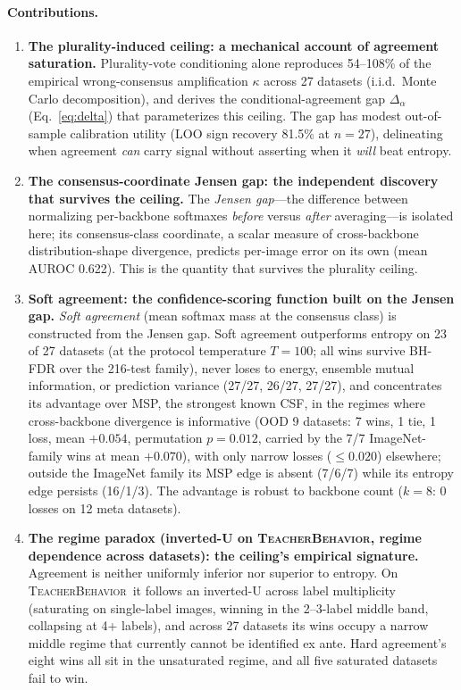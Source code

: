 \documentclass[a4paper,fleqn]{cas-sc}
\newcommand{\tb}{\textsc{TeacherBehavior}}
\begin{document}
\paragraph{Contributions.}
\begin{enumerate}
    \item \textbf{The plurality-induced ceiling: a mechanical account of agreement saturation.}
    Plurality-vote conditioning alone reproduces 54--108\% of the empirical wrong-consensus amplification $\kappa$ across 27 datasets (i.i.d.\ Monte Carlo decomposition), and derives the conditional-agreement gap $\Delta_\alpha$ (Eq.~\eqref{eq:delta}) that parameterizes this ceiling.
    The gap has modest out-of-sample calibration utility (LOO sign recovery 81.5\% at $n{=}27$), delineating when agreement \emph{can} carry signal without asserting when it \emph{will} beat entropy.

    \item \textbf{The consensus-coordinate Jensen gap: the independent discovery that survives the ceiling.}
    The \emph{Jensen gap}---the difference between normalizing per-backbone softmaxes \emph{before} versus \emph{after} averaging---is isolated here; its consensus-class coordinate, a scalar measure of cross-backbone distribution-shape divergence, predicts per-image error on its own (mean AUROC 0.622). This is the quantity that survives the plurality ceiling.

    \item \textbf{Soft agreement: the confidence-scoring function built on the Jensen gap.}
    \emph{Soft agreement} (mean softmax mass at the consensus class) is constructed from the Jensen gap.
    Soft agreement outperforms entropy on 23 of 27 datasets (at the protocol temperature $T{=}100$; all wins survive BH-FDR over the 216-test family), never loses to energy, ensemble mutual information, or prediction variance (27/27, 26/27, 27/27), and concentrates its advantage over MSP, the strongest known CSF, in the regimes where cross-backbone divergence is informative (OOD 9 datasets: 7 wins, 1 tie, 1 loss, mean $+0.054$, permutation $p{=}0.012$, carried by the 7/7 ImageNet-family wins at mean $+0.070$), with only narrow losses ($\le 0.020$) elsewhere; outside the ImageNet family its MSP edge is absent (7/6/7) while its entropy edge persists (16/1/3).
    The advantage is robust to backbone count ($k{=}8$: 0 losses on 12 meta datasets).

    \item \textbf{The regime paradox (inverted-U on \tb, regime dependence across datasets): the ceiling's empirical signature.}
    Agreement is neither uniformly inferior nor superior to entropy.
    On \tb\ it follows an inverted-U across label multiplicity (saturating on single-label images, winning in the 2--3-label middle band, collapsing at 4+ labels), and across 27 datasets its wins occupy a narrow middle regime that currently cannot be identified ex ante.
    Hard agreement's eight wins all sit in the unsaturated regime, and all five saturated datasets fail to win.


\end{enumerate}
\end{document}
